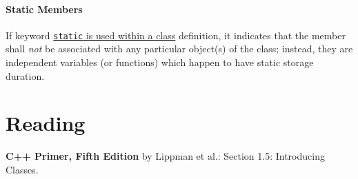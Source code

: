 \documentclass[12pt,letterpaper,twoside]{article}
\begin{document}
\paragraph{Static Members} If keyword 
\href{https://en.cppreference.com/w/cpp/language/static}
{\texttt{static} is used within a class}
definition, it indicates that the member shall \emph{not} be associated
with any particular object(s) of the class; instead, they are independent
variables (or functions) which happen to have static storage duration.

\section{Reading}\label{reading}

\textbf{C++ Primer, Fifth Edition} by Lippman et al.:
Section 1.5: Introducing Classes.
 
\end{document}
